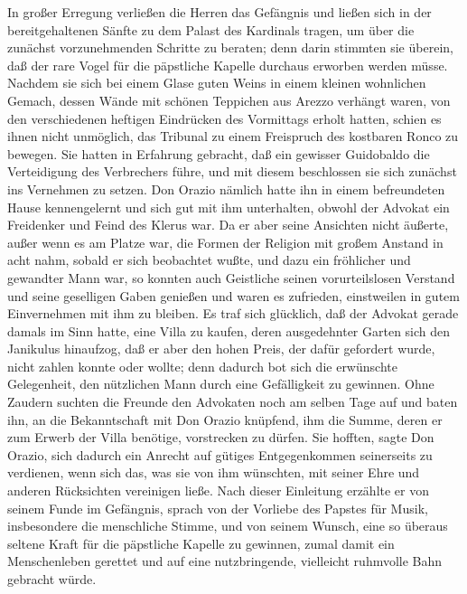 In großer Erregung verließen die Herren das Gefängnis und ließen
sich in der bereitgehaltenen Sänfte zu dem Palast des Kardinals
tragen, um über die zunächst vorzunehmenden Schritte zu beraten;
denn darin stimmten sie überein, daß der rare Vogel für die
päpstliche Kapelle durchaus erworben werden müsse. Nachdem sie sich
bei einem Glase guten Weins in einem kleinen wohnlichen Gemach,
dessen Wände mit schönen Teppichen aus Arezzo verhängt waren, von
den verschiedenen heftigen Eindrücken des Vormittags erholt hatten,
schien es ihnen nicht unmöglich, das Tribunal zu einem Freispruch
des kostbaren Ronco zu bewegen. Sie hatten in Erfahrung gebracht,
daß ein gewisser Guidobaldo die Verteidigung des Verbrechers führe,
und mit diesem beschlossen sie sich zunächst ins Vernehmen zu
setzen. Don Orazio nämlich hatte ihn in einem befreundeten Hause
kennengelernt und sich gut mit ihm unterhalten, obwohl der Advokat
ein Freidenker und Feind des Klerus war. Da er aber seine Ansichten
nicht äußerte, außer wenn es am Platze war, die Formen der Religion
mit großem Anstand in acht nahm, sobald er sich beobachtet wußte,
und dazu ein fröhlicher und gewandter Mann war, so konnten auch
Geistliche seinen vorurteilslosen Verstand und seine geselligen
Gaben genießen und waren es zufrieden, einstweilen in gutem
Einvernehmen mit ihm zu bleiben. Es traf sich glücklich, daß der
Advokat gerade damals im Sinn hatte, eine Villa zu kaufen, deren
ausgedehnter Garten sich den Janikulus hinaufzog, daß er aber den
hohen Preis, der dafür gefordert wurde, nicht zahlen konnte oder
wollte; denn dadurch bot sich die erwünschte Gelegenheit, den
nützlichen Mann durch eine \pagenum{[72]} Gefälligkeit zu gewinnen.
Ohne Zaudern suchten die Freunde den Advokaten noch am selben Tage
auf und baten ihn, an die Bekanntschaft mit Don Orazio knüpfend,
ihm die Summe, deren er zum Erwerb der Villa benötige, vorstrecken
zu dürfen. Sie hofften, sagte Don Orazio, sich dadurch ein Anrecht
auf gütiges Entgegenkommen seinerseits zu verdienen, wenn sich das,
was sie von ihm wünschten, mit seiner Ehre und anderen Rücksichten
vereinigen ließe. Nach dieser Einleitung erzählte er von seinem
Funde im Gefängnis, sprach von der Vorliebe des Papstes für Musik,
insbesondere die menschliche Stimme, und von seinem Wunsch, eine so
überaus seltene Kraft für die päpstliche Kapelle zu gewinnen, zumal
damit ein Menschenleben gerettet und auf eine nutzbringende,
vielleicht ruhmvolle Bahn gebracht würde.

